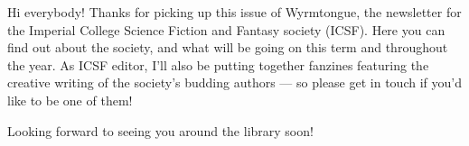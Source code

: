 Hi everybody! Thanks for picking up this issue of Wyrmtongue, the newsletter for the Imperial College Science Fiction and Fantasy society (ICSF). Here you can find out about the society, and what will be going on this term and throughout the year. As ICSF editor, I'll also be putting together fanzines featuring the creative writing of the society's budding authors --- so please get in touch if you'd like to be one of them! 

Looking forward to seeing you around the library soon!